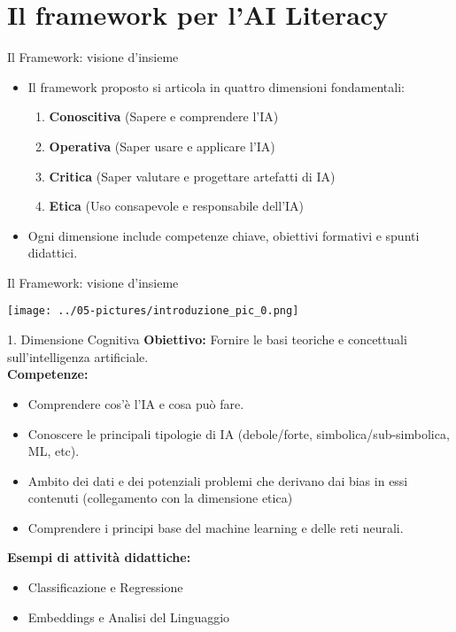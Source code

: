 \documentclass{beamer}
\begin{document}
\section{Il framework per l’AI Literacy}
%
%
\begin{frame}{Il Framework: visione d’insieme}
  \begin{itemize}
    \item Il framework proposto si articola in quattro dimensioni fondamentali:
    \vspace{0.2cm}
    \begin{enumerate}
    \normalsize
      \item \textbf{Conoscitiva} (Sapere e comprendere l’IA)
    \vspace{0.2cm}
      \item \textbf{Operativa} (Saper usare e applicare l’IA)
    \vspace{0.2cm}
      \item \textbf{Critica} (Saper valutare e progettare artefatti di IA)
    \vspace{0.2cm}
      \item \textbf{Etica} (Uso consapevole e responsabile dell’IA)
    \end{enumerate}
    \vspace{.5cm}
    \item Ogni dimensione include competenze chiave, obiettivi formativi e spunti didattici.
  \end{itemize}
\end{frame}
%
%
\begin{frame}{Il Framework: visione d’insieme}
\begin{center}
\texttt{[image: ../05-pictures/introduzione\_pic\_0.png]} 
\end{center}
\end{frame}
%
%
\begin{frame}{1. Dimensione Cognitiva}
  \textbf{Obiettivo:} Fornire le basi teoriche e concettuali sull’intelligenza artificiale.\\[1em]
  \textbf{Competenze:}
  \begin{itemize}
    \item Comprendere cos’è l’IA e cosa può fare.
    \item Conoscere le principali tipologie di IA (debole/forte, simbolica/sub-simbolica, ML, etc).
    \item Ambito dei dati e dei potenziali problemi che derivano dai bias in essi contenuti (collegamento con la dimensione etica)
    \item Comprendere i principi base del machine learning e delle reti neurali.
  \end{itemize}
  \textbf{Esempi di attività didattiche:}
  \begin{itemize}
    \item Classificazione e Regressione
    \item Embeddings e Analisi del Linguaggio
  \end{itemize}
\end{frame}
\end{document}
